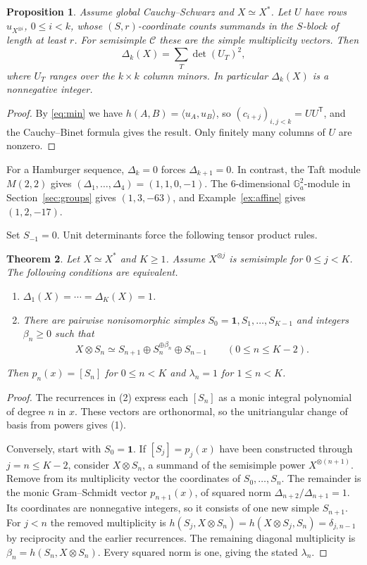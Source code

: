 \documentclass[11pt,reqno]{amsart}
\newtheorem{theorem}{Theorem}[section]
\newtheorem{proposition}[theorem]{Proposition}
\theoremstyle{definition}
\newcommand{\one}{\mathbf 1}
\newcommand{\C}{\mathcal C}
\newcommand{\Ga}{\mathbb G_a}
\begin{document}
\begin{proposition}\label{prop:binet}
Assume global Cauchy--Schwarz and $X\simeq X^*$. Let $U$ have rows $u_{X^{\otimes i}}$, $0\le i<k$, whose $(S,r)$-coordinate counts summands in the $S$-block of length at least $r$. For semisimple $\C$ these are the simple multiplicity vectors. Then
\[
 \Delta_k(X)=\sum_T\det(U_T)^2,
\]
where $U_T$ ranges over the $k\times k$ column minors. In particular $\Delta_k(X)$ is a nonnegative integer.
\end{proposition}

\begin{proof}
By \eqref{eq:min} we have $h(A,B)=\langle u_A,u_B\rangle$, so $(c_{i+j})_{i,j<k}=UU^{\mathsf T}$, and the Cauchy--Binet formula gives the result. Only finitely many columns of $U$ are nonzero.
\end{proof}

For a Hamburger sequence, $\Delta_k=0$ forces $\Delta_{k+1}=0$. In contrast, the Taft module $M(2,2)$ gives $(\Delta_1,\ldots,\Delta_4)=(1,1,0,-1)$. The 6-dimensional $\Ga^2$-module in Section~\ref{sec:groups} gives $(1,3,-63)$, and Example~\ref{ex:affine} gives $(1,2,-17)$.

Set $S_{-1}=0$. Unit determinants force the following tensor product rules.

\begin{theorem}\label{thm:unit}
Let $X\simeq X^*$ and $K\ge1$. Assume $X^{\otimes j}$ is semisimple for
$0\le j<K$. The following conditions are equivalent.
\begin{enumerate}
\item $\Delta_1(X)=\cdots=\Delta_K(X)=1$.
\item There are pairwise nonisomorphic simples $S_0=\one,S_1,\ldots,S_{K-1}$
and integers $\beta_n\ge0$ such that
\[
 X\otimes S_n\simeq S_{n+1}\oplus S_n^{\oplus\beta_n}\oplus S_{n-1}
 \qquad(0\le n\le K-2).
\]
\end{enumerate}
Then $p_n(x)=[S_n]$ for $0\le n<K$ and $\lambda_n=1$ for $1\le n<K$.
\end{theorem}
\begin{proof}
The recurrences in (2) express each $[S_n]$ as a monic integral polynomial
of degree $n$ in $x$. These vectors are orthonormal, so the unitriangular
change of basis from powers gives (1).

Conversely, start with $S_0=\one$. If $[S_j]=p_j(x)$ have been constructed
through $j=n\le K-2$, consider $X\otimes S_n$, a summand of the semisimple
power $X^{\otimes(n+1)}$. Remove from its multiplicity vector the coordinates
of $S_0,\ldots,S_n$. The remainder is the monic Gram--Schmidt vector
$p_{n+1}(x)$, of squared norm $\Delta_{n+2}/\Delta_{n+1}=1$.
Its coordinates are nonnegative integers, so it consists of one new simple
$S_{n+1}$. For $j<n$ the removed multiplicity is
$h(S_j,X\otimes S_n)=h(X\otimes S_j,S_n)=\delta_{j,n-1}$ by reciprocity
and the earlier recurrences. The remaining diagonal multiplicity is
$\beta_n=h(S_n,X\otimes S_n)$. Every squared norm is one, giving the
stated $\lambda_n$.
\end{proof}
\end{document}
